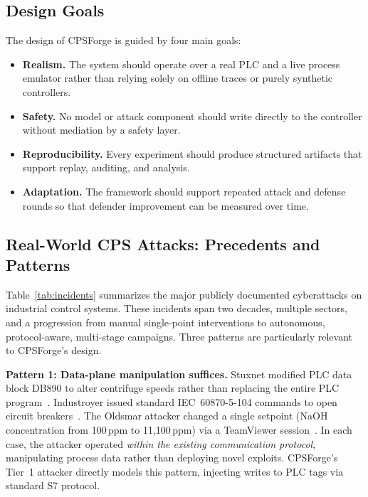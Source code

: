 \subsection{Design Goals}

The design of CPSForge is guided by four main goals:

\begin{itemize}[leftmargin=1.5em]
    \item \textbf{Realism.} The system should operate over a real PLC and a live process emulator rather than relying solely on offline traces or purely synthetic controllers.
    \item \textbf{Safety.} No model or attack component should write directly to the controller without mediation by a safety layer.
    \item \textbf{Reproducibility.} Every experiment should produce structured artifacts that support replay, auditing, and analysis.
    \item \textbf{Adaptation.} The framework should support repeated attack and defense rounds so that defender improvement can be measured over time.
\end{itemize}

\subsection{Real-World CPS Attacks: Precedents and Patterns}
\label{sec:background:incidents}

Table~\ref{tab:incidents} summarizes the major publicly documented cyberattacks on industrial control systems. These incidents span two decades, multiple sectors, and a progression from manual single-point interventions to autonomous, protocol-aware, multi-stage campaigns. Three patterns are particularly relevant to CPSForge's design.

\textbf{Pattern 1: Data-plane manipulation suffices.} Stuxnet modified PLC data block DB890 to alter centrifuge speeds rather than replacing the entire PLC program~\cite{langner2013kill}. Industroyer issued standard IEC~60870-5-104 commands to open circuit breakers~\cite{cherepanov2017industroyer}. The Oldsmar attacker changed a single setpoint (NaOH concentration from 100\,ppm to 11,100\,ppm) via a TeamViewer session~\cite{cisa2021oldsmar}. In each case, the attacker operated \emph{within the existing communication protocol}, manipulating process data rather than deploying novel exploits. CPSForge's Tier~1 attacker directly models this pattern, injecting writes to PLC tags via standard S7 protocol.

